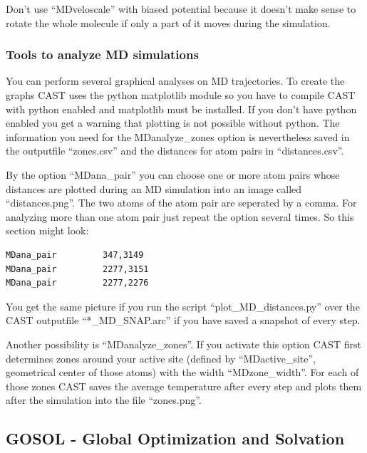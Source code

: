 \documentclass[10pt,a4paper]{article} %
\begin{document}
Don't use ``MDveloscale'' with biased potential because it doesn't make sense to rotate the whole molecule if only a part of it moves during the simulation.

\subsubsection{Tools to analyze MD simulations}

You can perform several graphical analyses on MD trajectories. To create the graphs CAST uses the python matplotlib module so you have to compile CAST with python enabled and matplotlib must be installed. If you don't have python enabled you get a warning that plotting is not possible without python. The information you need for the MDanalyze\_zones option is nevertheless saved in the outputfile ``zones.csv'' and the distances for atom pairs in ``distances.csv''.

By the option ``MDana\_pair'' you can choose one or more atom pairs whose distances are plotted during an MD simulation into an image called ``distances.png''. The two atoms of the atom pair are seperated by a comma. For analyzing more than one atom pair just repeat the option several times. So this section might look: 
			\begin{lstlisting}
MDana_pair         347,3149
MDana_pair         2277,3151
MDana_pair         2277,2276
	\end{lstlisting}
	You get the same picture if you run the script ``plot\_MD\_distances.py'' over the CAST outputfile ``*\_MD\_SNAP.arc'' if you have saved a snapshot of every step.

Another possibility is ``MDanalyze\_zones''. If you activate this option CAST first determines zones around your active site (defined by ``MDactive\_site'', geometrical center of those atoms) with the width ``MDzone\_width''. For each of those zones CAST saves the average temperature after every step and plots them after the simulation into the file ``zones.png''. 
	
\subsection{GOSOL - Global Optimization and Solvation}	

	
\end{document}
